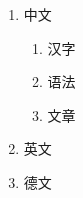 \begin{enumerate}    
    \item 中文
    \begin{enumerate}
        \item 汉字
        \item 语法
        \item 文章
    \end{enumerate}
    \item 英文
    \item 德文
\end{enumerate}